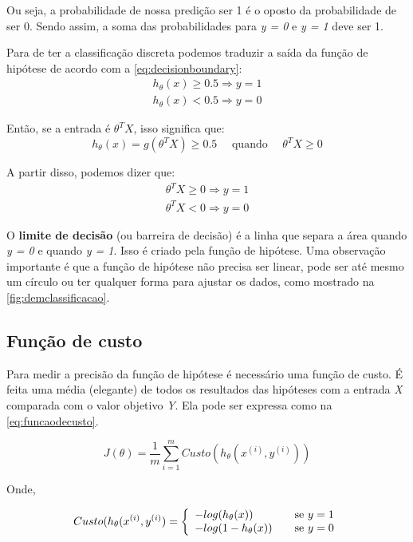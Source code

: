 Ou seja, a probabilidade de nossa predição ser 1 é o oposto da probabilidade de ser 0. Sendo assim, a soma das probabilidades para \textit{y = 0} e \textit{y = 1} deve ser 1.

Para de ter a classificação discreta podemos traduzir a saída da função de hipótese de acordo com a \autoref{eq:decisionboundary}:
\begin{align} 
h_{\theta}(x) \geq 0.5 \Rightarrow y = 1 \nonumber \\
h_{\theta}(x) < 0.5 \Rightarrow y = 0 \label{eq:decisionboundary}
\end{align}

Então, se a entrada é $\theta^TX$, isso significa que:
\begin{equation}
h_{\theta}(x) = g(\theta^TX) \geq 0.5 \quad \text{ quando } \quad \theta^TX \geq 0 \nonumber
\end{equation}

A partir disso, podemos dizer que:
\begin{align}
\theta^TX \geq 0 \Rightarrow y = 1 \nonumber \\
\theta^TX < 0 \Rightarrow y = 0 \nonumber
\end{align}

O \textbf{limite de decisão} (ou barreira de decisão) é a linha que separa a área quando \textit{y = 0} e quando \textit{y = 1}. Isso é criado pela função de hipótese. Uma observação importante é que a função de hipótese não precisa ser linear, pode ser até mesmo um círculo ou ter qualquer forma para ajustar os dados, como mostrado na \autoref{fig:demclassificacao}.


\subsection{Função de custo}

Para medir a precisão da função de hipótese é necessário uma função de custo. É feita uma média (elegante) de todos os resultados das hipóteses com a entrada \textit{X} comparada com o valor objetivo \textit{Y}. Ela pode ser expressa como na \autoref{eq:funcaodecusto}.

\begin{equation}
\label{eq:funcaodecusto}
J(\theta) = \frac{1}{m}\sum\limits_{i=1}^{m}Custo(h_{\theta}(x^{(i)}, y^{(i)}))
\end{equation}

Onde,


\begin{align}
 Custo(h_{\theta}(x^{(i)}, y^{(i)}) = \left\{
  \begin{array}{l l} 
    -log(h_{\theta}(x)) & \quad \text{se } y=1 \\
    -log(1 - h_{\theta}(x)) & \quad \text{se } y=0 \label{eq:funcaocusto}
  \end{array} \right.
\end{align}


